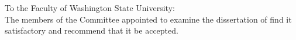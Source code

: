 \label{chap:signatures}

\begin{singlespace}
  \noindent
  \vspace{1.5in}

  \noindent To the Faculty of Washington State University:\\
  
  The members of the Committee appointed to examine the dissertation of
  \medskip
  \MakeUppercase{\myname}
  find it satisfactory and recommend that it be accepted.
  
  \begin{flushright}
    \\
    \\
  \end{flushright}
\end{singlespace}
\newpage
